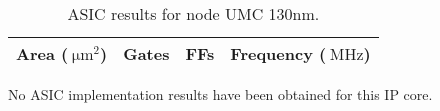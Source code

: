 \ifdefined\ASIC
\begin{table}[H]
\centering
\begin{tabular}{|c|c|c|c|}
\hline
\rowcolor{iob-green}
\textbf{Area} ($\SI{}{\micro\meter\squared}$)  & \textbf{Gates}  & \textbf{FFs}  & \textbf{Frequency} ($\SI{}{\mega\hertz}$)\\
\hline
\hline

\end{tabular}
\caption{ASIC results for node UMC 130nm.}
\label{tab:asic_results}
\end{table}
\else
No ASIC implementation results have been obtained for this IP core.
\fi
